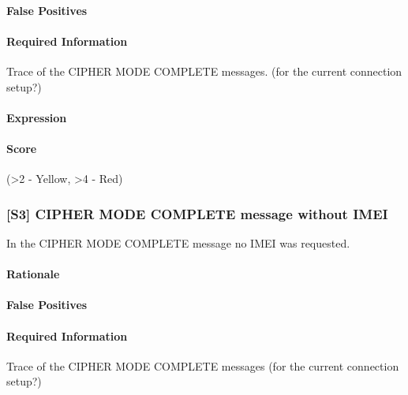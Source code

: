 \documentclass[a4paper,11pt,notitlepage,bigheadings,oneside]{scrartcl}
\begin{document}
\paragraph{False Positives}

\TBD

\paragraph{Required Information}

Trace of the CIPHER MODE COMPLETE messages. (for the current connection setup?)

\paragraph{Expression}

\TBD

\paragraph{Score}

\TBD{} (\textgreater 2 - Yellow, \textgreater 4 - Red)

\subsubsection{[S3] CIPHER MODE COMPLETE message without IMEI}

In the CIPHER MODE COMPLETE message no IMEI was requested.


\paragraph{Rationale}

\TBD

\paragraph{False Positives}

\TBD


\paragraph{Required Information}

\TBD

Trace of the CIPHER MODE COMPLETE messages (for the current connection setup?)
\end{document}
